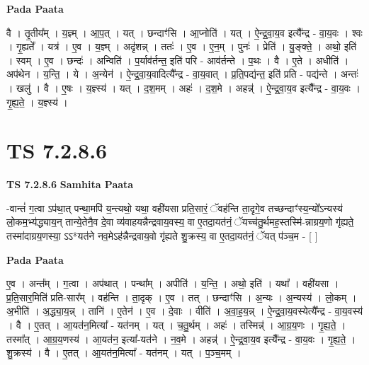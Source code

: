 \documentclass[17pt]{extarticle}
\begin{document}
\textbf{Pada Paata} \newline

वै । तृ॒तीय᳚म् । य॒ज्ञ्म् । आ॒प॒त् । यत् । छन्दाꣳ॑सि । आ॒प्नोति॑ । यत् । ऐ॒न्द्र॒वा॒य॒व इत्यै᳚न्द्र - वा॒य॒वः । श्वः । गृ॒ह्यते᳚ । यत्र॑ । ए॒व । य॒ज्ञ्म् । अदृ॑शन्न् । ततः॑ । ए॒व । ए॒न॒म् । पुनः॑ । प्रेति॑ । यु॒ङ्क्ते॒ । अथो॒ इति॑ । स्वम् । ए॒व । छन्दः॑ । अन्विति॑ । प॒र्याव॑र्तन्त॒ इति॑ परि - आव॑र्तन्ते । प॒थः । वै । ए॒ते । अधीति॑ । अप॑थेन । य॒न्ति॒ । ये । अ॒न्येन॑ । ऐ॒न्द्र॒वा॒य॒वादित्यै᳚न्द्र - वा॒य॒वात् । प्र॒ति॒पद्य॑न्त॒ इति॑ प्रति - पद्य॑न्ते । अन्तः॑ । खलु॑ । वै । ए॒षः । य॒ज्ञ्स्य॑ । यत् । द॒श॒मम् । अहः॑ । द॒श॒मे । अहन्न्॑ । ऐ॒न्द्र॒वा॒य॒व इत्यै᳚न्द्र - वा॒य॒वः । गृ॒ह्य॒ते॒ । य॒ज्ञ्स्य॑ ।  \newline





\section{ TS 7.2.8.6 }

\textbf{TS 7.2.8.6 } \newline
\textbf{Samhita Paata} \newline

-वान्तं॑ ग॒त्वा ऽप॑था॒त् पन्था॒मपि॑ य॒न्त्यथो॒ यथा॒ वही॑यसा प्रति॒सारं॒ ॅवह॑न्ति ता॒दृगे॒व तच्छन्दाꣳ॑स्य॒न्यो᳚ऽन्यस्य॑ लो॒कम॒भ्य॑द्ध्याय॒न् तान्ये॒तेनै॒व दे॒वा व्य॑वाहयन्नैन्द्रवाय॒वस्य॒ वा ए॒तदा॒यत॑नं॒ ॅयच्च॑तु॒र्थमह॒स्तस्मि॑-न्नाग्रय॒णो गृ॑ह्यते॒ तस्मा॑दाग्रय॒णस्या॒ ऽऽ*यत॑ने नव॒मेऽह॑न्नैन्द्रवाय॒वो गृ॑ह्यते शु॒क्रस्य॒ वा ए॒तदा॒यत॑नं॒ ॅयत् प॑ञ्च॒म - [  ] \newline

\textbf{Pada Paata} \newline

ए॒व । अन्त᳚म् । ग॒त्वा । अप॑थात् । पन्था᳚म् । अपीति॑ । य॒न्ति॒ । अथो॒ इति॑ । यथा᳚ । वही॑यसा । प्र॒ति॒सार॒मिति॑ प्रति-सार᳚म् । वह॑न्ति । ता॒दृक् । ए॒व । तत् । छन्दाꣳ॑सि । अ॒न्यः । अ॒न्यस्य॑ । लो॒कम् । अ॒भीति॑ । अ॒द्ध्या॒य॒न्न् । तानि॑ । ए॒तेन॑ । ए॒व । दे॒वाः । वीति॑ । अ॒वा॒ह॒य॒न्न् । ऐ॒न्द्र॒वा॒य॒वस्येत्यै᳚न्द्र - वा॒य॒वस्य॑ । वै । ए॒तत् । आ॒यत॑न॒मित्या᳚ - यत॑नम् । यत् । च॒तु॒र्थम् । अहः॑ । तस्मिन्न्॑ । आ॒ग्र॒य॒णः । गृ॒ह्य॒ते॒ । तस्मा᳚त् । आ॒ग्र॒य॒णस्य॑ । आ॒यत॑न॒ इत्या᳚-यत॑ने । न॒व॒मे । अहन्न्॑ । ऐ॒न्द्र॒वा॒य॒व इत्यै᳚न्द्र - वा॒य॒वः । गृ॒ह्य॒ते॒ । शु॒क्रस्य॑ । वै । ए॒तत् । आ॒यत॑न॒मित्या᳚ - यत॑नम् । यत् । प॒ञ्च॒मम् ।  \newline
\end{document}
